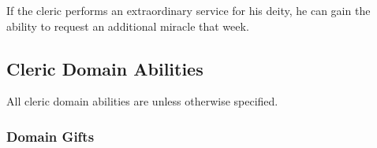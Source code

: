         If the cleric performs an extraordinary service for his deity, he can gain the ability to request an additional miracle that week.

    \subsection{Cleric Domain Abilities}
        All cleric domain abilities are  unless otherwise specified.

        \subsubsection{Domain Gifts}\label{Domain Gifts}

